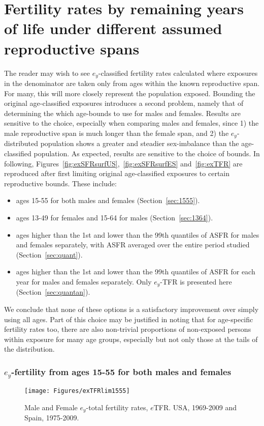 % 

\chapter{Fertility rates by remaining years of life under different assumed
reproductive spans}
\label{Appendix:reprospans2}
The reader may wish to see $e_y$-classified fertility rates calculated
where exposures in the denominator are taken only from ages within the known
reproductive span. For many, this will more closely represent the population exposed. Bounding the
original age-classified exposures introduces a second problem, namely that of
determining the which age-bounds to use for males and females. Results are
sensitive to the choice, especially when comparing males and females, since 1)
the male reproductive span is much longer than the female span, and 2) the
$e_y$-distributed population shows a greater and steadier sex-imbalance than the
age-classified population. As expected, results are sensitive to the choice of
bounds. In following, Figures~\ref{fig:exSFRsurfUS},~\ref{fig:exSFRsurfES}
and~\ref{fig:exTFR} are reproduced after first limiting original
age-classified exposures to certain reproductive bounds. These include:

\begin{itemize}
  \item ages 15-55 for both males and females (Section~\ref{sec:1555}).
  \item ages 13-49 for females and 15-64 for males (Section~\ref{sec:1364}).
  \item ages higher than the 1st and lower than the 99th
  quantiles of ASFR for males and females separately, with ASFR averaged over the entire period
  studied (Section~\ref{sec:quant}).
  \item ages higher than the 1st and lower than the
  99th quantiles of ASFR for each year for males and females separately. Only
  $e_y$-TFR is presented here (Section~\ref{sec:quantan}).
\end{itemize}

We conclude that none of these options is a satisfactory improvement over simply
using all ages. Part of this choice may be justified in noting that for
age-specific fertility rates too, there are also non-trivial proportions of
non-exposed persons within exposure for many age groups, especially but not only
those at the tails of the distribution.
\pagebreak

\subsection{$e_y$-fertility from ages 15-55 for both males and females}
\begin{figure}[ht!]
        \centering  
          \caption{Male and Female $e_y$-total fertility rates, $e$TFR. USA, 1969-2009 and Spain, 1975-2009.}
           \texttt{[image: Figures/exTFRlim1555]}
          \label{fig:exTFRlim15_55}
\end{figure}

